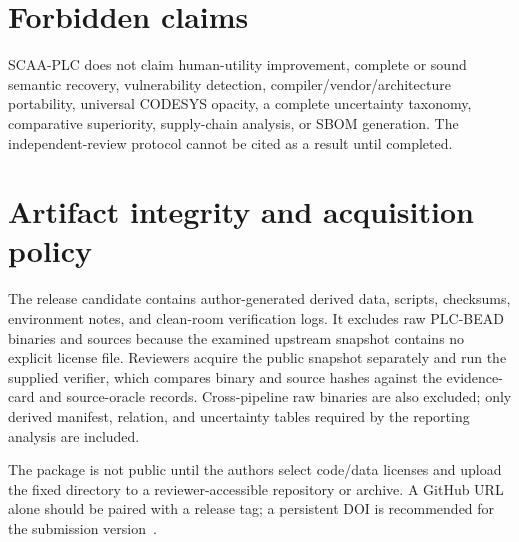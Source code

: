 \documentclass[manuscript,screen,review]{acmart}
\begin{document}
\section{Forbidden claims}

SCAA-PLC does not claim human-utility improvement, complete or sound semantic recovery, vulnerability detection, compiler/vendor/architecture portability, universal CODESYS opacity, a complete uncertainty taxonomy, comparative superiority, supply-chain analysis, or SBOM generation. The independent-review protocol cannot be cited as a result until completed.

\section{Artifact integrity and acquisition policy}

The release candidate contains author-generated derived data, scripts, checksums, environment notes, and clean-room verification logs. It excludes raw PLC-BEAD binaries and sources because the examined upstream snapshot contains no explicit license file. Reviewers acquire the public snapshot separately and run the supplied verifier, which compares binary and source hashes against the evidence-card and source-oracle records. Cross-pipeline raw binaries are also excluded; only derived manifest, relation, and uncertainty tables required by the reporting analysis are included.

The package is not public until the authors select code/data licenses and upload the fixed directory to a reviewer-accessible repository or archive. A GitHub URL alone should be paired with a release tag; a persistent DOI is recommended for the submission version~\cite{heumueller_software_artifacts2020}.



\end{document}
